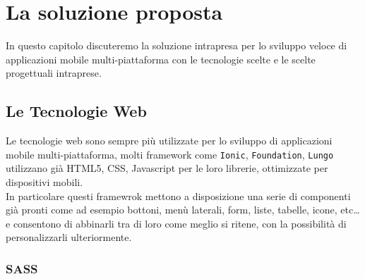 \chapter{La soluzione proposta}
In questo capitolo discuteremo la soluzione intrapresa per lo sviluppo veloce di applicazioni mobile multi-piattaforma con le tecnologie scelte e le scelte progettuali intraprese. 
\section{Le Tecnologie Web}
Le tecnologie web sono sempre più utilizzate per lo sviluppo di applicazioni mobile multi-piattaforma, molti framework come \texttt{Ionic}, \texttt{Foundation}, \texttt{Lungo} utilizzano già HTML5, CSS, Javascript per le loro librerie, ottimizzate per dispositivi mobili.\\
In particolare questi framewrok mettono a disposizione una serie di componenti già pronti come ad esempio bottoni, menù laterali, form, liste, tabelle, icone, etc\dots e consentono di abbinarli tra di loro come meglio si ritene, con la possibilità di personalizzarli ulteriormente.\\
\subsection{SASS}
